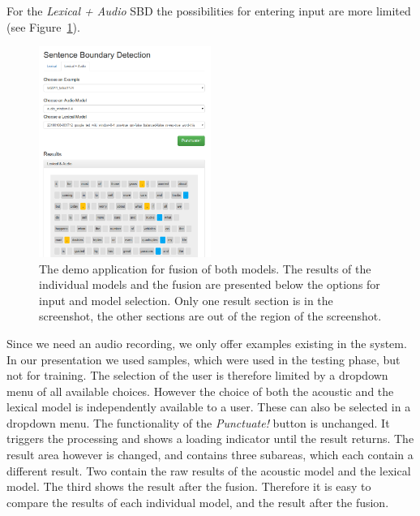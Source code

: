 For the \emph{Lexical + Audio} SBD the possibilities for entering input are more limited (see Figure~\ref{fig:demo_la}).
\begin{figure}[ht]
    \centering
    \includegraphics[width=0.5\textwidth]{img/demo_l_a.png}
    \caption{The demo application for fusion of both models. The results of the individual models and the fusion are presented below the options for input and model selection. Only one result section is in the screenshot, the other sections are out of the region of the screenshot.}
    \label{fig:demo_la}
\end{figure}
Since we need an audio recording, we only offer examples existing in the system.
In our presentation we used samples, which were used in the testing phase, but not for training.
The selection of the user is therefore limited by a dropdown menu of all available choices.
However the choice of both the acoustic and the lexical model is independently available to a user.
These can also be selected in a dropdown menu.
The functionality of the \emph{Punctuate!} button is unchanged.
It triggers the processing and shows a loading indicator until the result returns.
The result area however is changed, and contains three subareas, which each contain a different result.
Two contain the raw results of the acoustic model and the lexical model.
The third shows the result after the fusion.
Therefore it is easy to compare the results of each individual model, and the result after the fusion.
